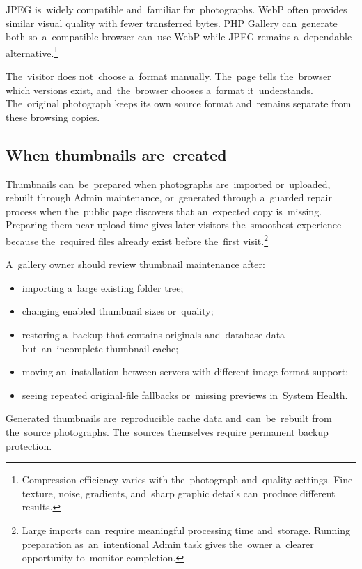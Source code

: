 \documentclass[11pt,a4paper]{article}
\begin{document}
JPEG is~widely compatible and~familiar for~photographs. WebP often provides
similar visual quality with fewer transferred bytes. PHP Gallery can~generate
both so~a~compatible browser can~use WebP while JPEG remains a~dependable
alternative.\footnote{Compression efficiency varies with the~photograph
and~quality settings. Fine texture, noise, gradients, and~sharp graphic details
can~produce different results.}

The~visitor does not~choose a~format manually. The~page tells the~browser which
versions exist, and~the~browser chooses a~format it~understands. The~original
photograph keeps its own source format and~remains separate from these browsing
copies.

\subsection{When thumbnails are~created}

Thumbnails can~be~prepared when photographs are~imported or~uploaded, rebuilt
through Admin maintenance, or~generated through a~guarded repair process when
the~public page discovers that an~expected copy is~missing. Preparing them near
upload time gives later visitors the~smoothest experience because the~required
files already exist before the~first visit.\footnote{Large imports can~require
meaningful processing time and~storage. Running preparation as~an~intentional
Admin task gives the~owner a~clearer opportunity to~monitor completion.}

A~gallery owner should review thumbnail maintenance after:

\begin{itemize}
  \item importing a~large existing folder tree;
  \item changing enabled thumbnail sizes or~quality;
  \item restoring a~backup that contains originals and~database data
  but~an~incomplete thumbnail cache;
  \item moving an~installation between servers with different image-format
  support;
  \item seeing repeated original-file fallbacks or~missing previews in~System
  Health.
\end{itemize}

Generated thumbnails are~reproducible cache data and~can~be~rebuilt from
the~source photographs. The~sources themselves require permanent backup
protection.
\end{document}

